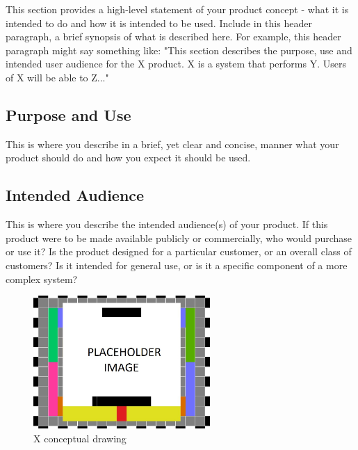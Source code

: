 This section provides a high-level statement of your product concept - what it is intended to do and how it is intended to be used. Include in this header paragraph, a brief synopsis of what is described here. For example, this header paragraph might say something like: "This section describes the purpose, use and intended user audience for the X product. X is a system that performs Y. Users of X will be able to Z..."

\subsection{Purpose and Use}
This is where you describe in a brief, yet clear and concise, manner what your product should do and how you expect it should be used.

\subsection{Intended Audience}
This is where you describe the intended audience(s) of your product. If this product were to be made available publicly or commercially, who would purchase or use it? Is the product designed for a particular customer, or an overall class of customers? Is it intended for general use, or is it a specific component of a more complex system?

\begin{figure}[h!]
	\centering
   	\includegraphics[width=0.60\textwidth]{images/test_image}
    \caption{X conceptual drawing}
\end{figure}
